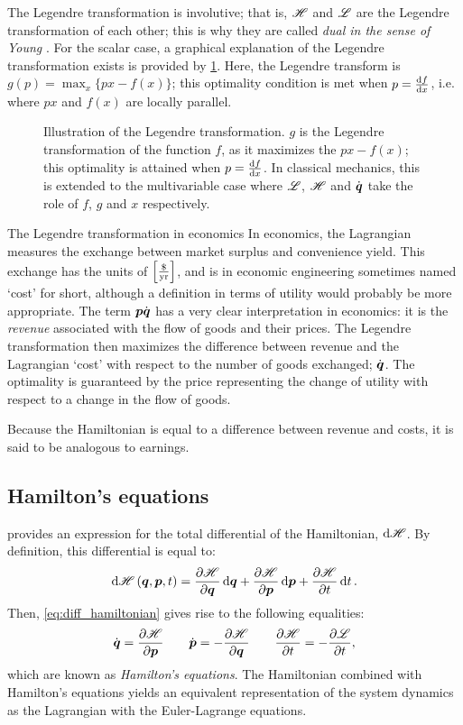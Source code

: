The Legendre transformation is involutive; that is, $\mathscr{H}$ and $\mathscr{L}$ are the Legendre transformation of each other; this is why they are called \emph{dual in the sense of Young} \cite{Arnold1989}. For the scalar case, a graphical explanation of the Legendre transformation exists is provided by \cref{fig:legendre_transform}. Here, the Legendre transform is $g(p) = \max_x \{px - f(x)\}$; this optimality condition is met when $p = \dv{f}{x}$, i.e. where $px$ and $f(x)$ are locally parallel.
\begin{figure}
    \centering
    
    \caption{Illustration of the Legendre transformation. $g$ is the Legendre transformation of the function $f$, as it maximizes the $px - f(x)$; this optimality is attained when $p = \dv{f}{x}$. In classical mechanics, this is extended to the multivariable case where $\mathscr{L}$, $\mathscr{H}$ and $\dot{\vb*{q}}$ take the role of $f$, $g$ and $x$ respectively.}
    \label{fig:legendre_transform}
\end{figure}

\begin{econ}{The Legendre transformation in economics}
    In economics, the Lagrangian measures the exchange between market surplus and convenience yield. This exchange has the units of $\qty[\frac{\$}{\text{yr}}]$, and is in economic engineering sometimes named `cost' for short, although a definition in terms of utility would probably be more appropriate. The term $\vb*{p}\dot{\vb*{q}}$ has a very clear interpretation in economics: it is the \emph{revenue} associated with the flow of goods and their prices. The Legendre transformation then maximizes the difference between revenue and the Lagrangian `cost' with respect to the number of goods exchanged; $\dot{\vb*{q}}$. The optimality is guaranteed by the price representing the change of utility with respect to a change in the flow of goods.

    Because the Hamiltonian is equal to a difference between revenue and costs, it is said to be analogous to earnings.
\end{econ}

\subsection{Hamilton's equations}
\label{sec:hamilton_eqs}
 provides an expression for the total differential of the Hamiltonian, $\dd{\ensuremath{\mathscr{H}}}$. By definition, this differential is equal to:
$$ \dd{\ensuremath{\mathscr{H}}}(\vb*{q}, \vb*{p}, t) = \pdv{\ensuremath{\mathscr{H}}}{\ensuremath{\vb*{q}}}\dd{\ensuremath{\vb*{q}}} + \pdv{\ensuremath{\mathscr{H}}}{\ensuremath{\vb*{p}}}\dd{\ensuremath{\vb*{p}}} + \pdv{\ensuremath{\mathscr{H}}}{t}\dd{t}. $$
Then, \cref{eq:diff_hamiltonian} gives rise to the following equalities:
\begin{equation}
    \dot{\vb*{q}} = \pdv{\ensuremath{\mathscr{H}}}{\ensuremath{\vb*{p}}} \qquad \dot{\vb*{p}} = -\pdv{\ensuremath{\mathscr{H}}}{\ensuremath{\vb*{q}}} \qquad \pdv{\ensuremath{\mathscr{H}}}{t} = - \pdv{\ensuremath{\mathscr{L}}}{t},
    \label{eq:ham_eqs}
\end{equation}
which are known as \emph{Hamilton's equations}. The Hamiltonian combined with Hamilton's equations yields an equivalent representation of the system dynamics as the Lagrangian with the Euler-Lagrange equations.

